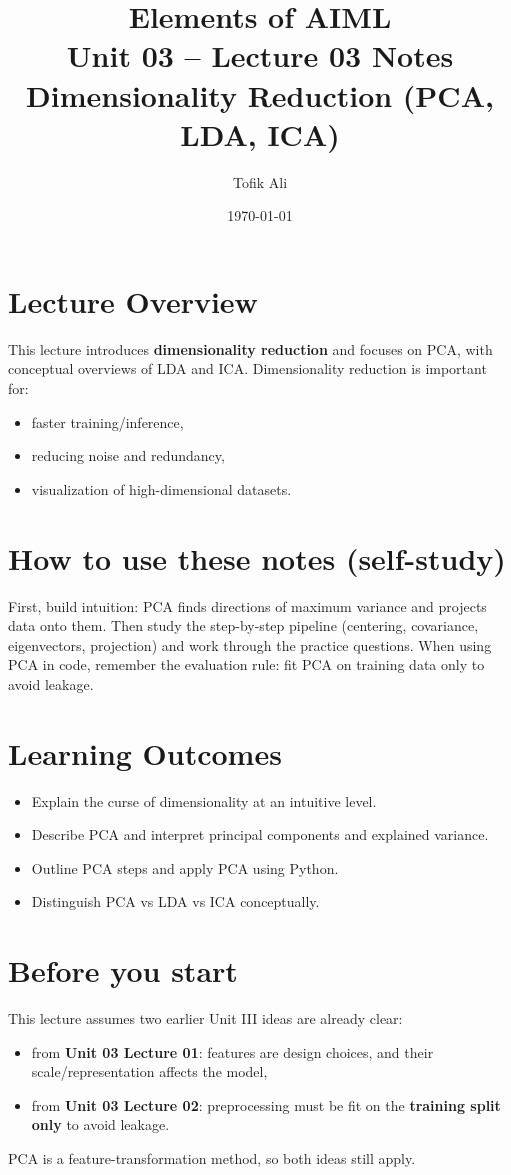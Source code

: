 \documentclass[11pt]{article}
\title{Elements of AIML\\Unit 03 -- Lecture 03 Notes\\Dimensionality Reduction (PCA, LDA, ICA)}
\author{Tofik Ali}
\date{\today}
\begin{document}
\maketitle
\tableofcontents

\section{Lecture Overview}
This lecture introduces \textbf{dimensionality reduction} and focuses on PCA, with conceptual overviews of LDA and ICA.
Dimensionality reduction is important for:
\begin{itemize}[leftmargin=*]
  \item faster training/inference,
  \item reducing noise and redundancy,
  \item visualization of high-dimensional datasets.
\end{itemize}
\notesources{\AIMLUnitIIISources}

\section{How to use these notes (self-study)}
First, build intuition: PCA finds directions of maximum variance and projects data onto them.
Then study the step-by-step pipeline (centering, covariance, eigenvectors, projection) and work through the practice questions.
When using PCA in code, remember the evaluation rule: fit PCA on training data only to avoid leakage.

\section{Learning Outcomes}
\begin{itemize}[leftmargin=*]
  \item Explain the curse of dimensionality at an intuitive level.
  \item Describe PCA and interpret principal components and explained variance.
  \item Outline PCA steps and apply PCA using Python.
  \item Distinguish PCA vs LDA vs ICA conceptually.
\end{itemize}

\section{Before you start}
This lecture assumes two earlier Unit III ideas are already clear:
\begin{itemize}[leftmargin=*]
  \item from \textbf{Unit 03 Lecture 01}: features are design choices, and their scale/representation affects the model,
  \item from \textbf{Unit 03 Lecture 02}: preprocessing must be fit on the \textbf{training split only} to avoid leakage.
\end{itemize}
PCA is a feature-transformation method, so both ideas still apply.
\end{document}
